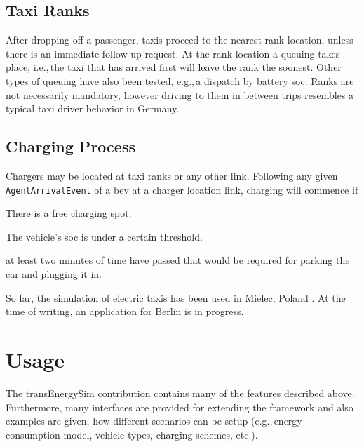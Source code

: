 \subsection{Taxi Ranks}
After dropping off a passenger, taxis proceed to the nearest rank location, unless there is an immediate follow-up request. At the rank location a queuing takes place, i.e.,\,the taxi that has arrived first will leave the rank the soonest. Other types of queuing have also been tested, e.g.,\,a dispatch by battery \gls{soc}.
Ranks are not necessarily mandatory, however driving to them in between trips resembles a typical taxi driver behavior in Germany.

\subsection{Charging Process}
Chargers may be located at taxi ranks or any other link. Following any given \lstinline$AgentArrivalEvent$ of a \gls{bev} at a charger location link, charging will commence if
%
\begin{compactitem}
	\item There is a free charging spot.
	\item The vehicle's \gls{soc} is under a certain threshold.
	\item at least two minutes of time have passed that would be required for parking the car and plugging it in.
\end{compactitem}

So far, the simulation of electric taxis has been used in Mielec, Poland \citep[][]{Bischoff2013MaTaxis, BischoffMaciejewskiEcabMielecMobilTUM}. At the time of writing, an application for Berlin is in progress.

\section{Usage}
The transEnergySim \gls{contribution} contains many of the features described above. Furthermore, many interfaces are provided for extending the framework and also examples are given, how different scenarios can be setup (e.g.,\,energy consumption model, vehicle types, charging schemes, etc.).


